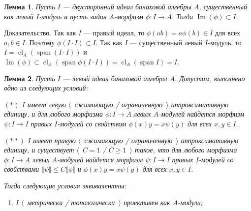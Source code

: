 \documentclass[12pt]{article}
\numberwithin{equation}{subsection}
\theoremstyle{plain}
\newtheorem{lemma}{Лемма}
\newenvironment{proof}{Доказательство.}{}
\begin{document}
\begin{fulltext}
\begin{lemma}\label{ImgOfAMorphFromBiIdToA} Пусть $I$ --- двусторонний идеал
банаховой алгебры $A$, существенный как левый $I$-модуль и пусть задан
$A$-морфизм $\phi:I\to A$. Тогда $\operatorname{Im}(\phi)\subset I$.
\end{lemma}
\begin{proof} Так как $I$ --- правый идеал, то $\phi(ab)=a\phi(b)\in I$ для всех
$a,b\in I$. Поэтому $\phi(I\cdot I)\subset I$. Так как $I$ --- существенный
левый $I$-модуль, то $I=\operatorname{cl}_A(\operatorname{span}(I\cdot I))$ и
$\operatorname{Im}(\phi)\subset\operatorname{cl}_A(\operatorname{span}\phi(I\cdot
I))=\operatorname{cl}_A(\operatorname{span}I)=I$.
\end{proof}

\begin{lemma}\label{GoodIdealMetTopProjIsUnital} Пусть $I$ --- левый идеал
банаховой алгебры $A$. Допустим, выполнено одно из следующих условий:

$(*)$ $I$ имеет левую $\langle$~сжимающую / ограниченную~$\rangle$
аппроксимативную единицу, и для любого морфизма $\phi:I\to A$ левых $A$-модулей
найдется морфизм $\psi:I\to I$ правых $I$-модулей со свойством
$\phi(x)y=x\psi(y)$ для всех $x,y\in I$.

$(**)$ $I$ имеет правую $\langle$~сжимающую / ограниченную~$\rangle$
аппроксимативную единицу, и существует $\langle$~$C=1$ / $C\geq 1$~$\rangle$
такое, что для любого морфизма $\phi:I\to A$ левых $A$-модулей найдется морфизм
$\psi:I\to I$ правых $I$-модулей со свойствами $\Vert\psi\Vert\leq
C\Vert\phi\Vert$ и $\phi(x)y=x\psi(y)$ для всех $x,y\in I$.

Тогда следующие условия эквивалентны:
\begin{enumerate}
    \item $I$ $\langle$~метрически / топологически~$\rangle$ проективен как
    $A$-модуль;


\end{enumerate}
\end{lemma}
\end{fulltext}
\end{document}
